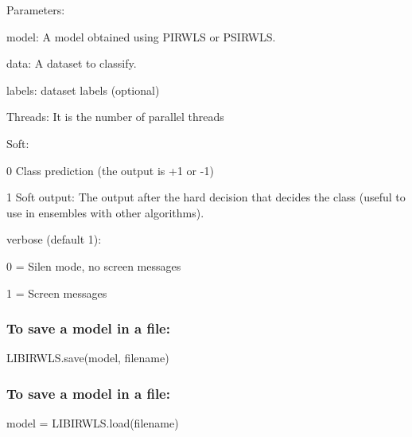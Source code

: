 Parameters\+:
\begin{DoxyItemize}
\item model\+: A model obtained using P\+I\+R\+W\+LS or P\+S\+I\+R\+W\+LS.
\item data\+: A dataset to classify.
\item labels\+: dataset labels (optional)
\item Threads\+: It is the number of parallel threads
\item Soft\+:
\begin{DoxyItemize}
\item 0 Class prediction (the output is +1 or -\/1)
\item 1 Soft output\+: The output after the hard decision that decides the class (useful to use in ensembles with other algorithms).
\end{DoxyItemize}
\item verbose (default 1)\+:
\begin{DoxyItemize}
\item 0 = Silen mode, no screen messages
\item 1 = Screen messages
\end{DoxyItemize}
\end{DoxyItemize}

\subsubsection*{To save a model in a file\+:}

\begin{DoxyVerb}    LIBIRWLS.save(model, filename)
\end{DoxyVerb}


\subsubsection*{To save a model in a file\+:}

\begin{DoxyVerb}    model = LIBIRWLS.load(filename)\end{DoxyVerb}
 